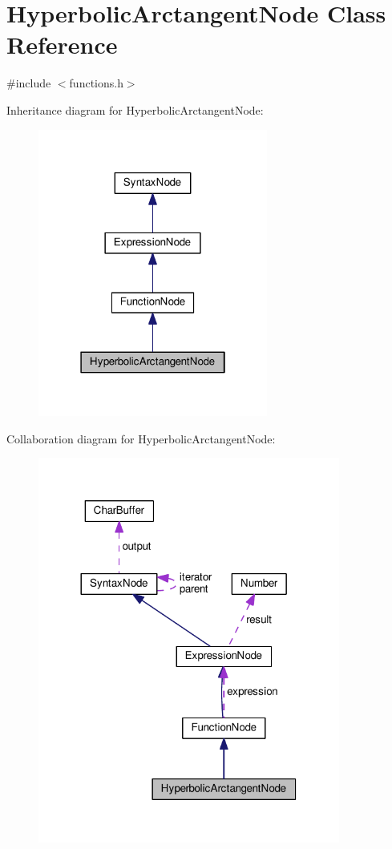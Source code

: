 \hypertarget{classHyperbolicArctangentNode}{}\section{Hyperbolic\+Arctangent\+Node Class Reference}
\label{classHyperbolicArctangentNode}


{\ttfamily \#include $<$functions.\+h$>$}



Inheritance diagram for Hyperbolic\+Arctangent\+Node\+:
\nopagebreak
\begin{figure}[H]
\begin{center}
\leavevmode
\includegraphics[width=214pt]{db/d14/classHyperbolicArctangentNode__inherit__graph}
\end{center}
\end{figure}


Collaboration diagram for Hyperbolic\+Arctangent\+Node\+:
\nopagebreak
\begin{figure}[H]
\begin{center}
\leavevmode
\includegraphics[width=281pt]{d3/d8f/classHyperbolicArctangentNode__coll__graph}
\end{center}
\end{figure}

